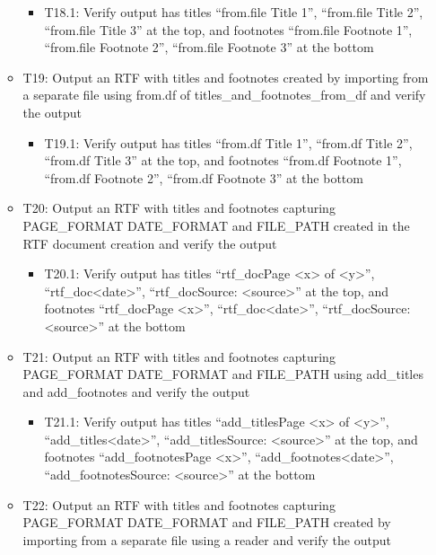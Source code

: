 \documentclass[]{article}
\providecommand{\tightlist}{%
  \setlength{\itemsep}{0pt}\setlength{\parskip}{0pt}}
\begin{document}
\begin{itemize}
\begin{itemize}
    \begin{itemize}
    \tightlist
    \item
      T18.1: Verify output has titles ``from.file Title 1'', ``from.file
      Title 2'', ``from.file Title 3'' at the top, and footnotes
      ``from.file Footnote 1'', ``from.file Footnote 2'', ``from.file
      Footnote 3'' at the bottom
    \end{itemize}
  \item
    T19: Output an RTF with titles and footnotes created by importing
    from a separate file using from.df of
    titles\_and\_footnotes\_from\_df and verify the output

    \begin{itemize}
    \tightlist
    \item
      T19.1: Verify output has titles ``from.df Title 1'', ``from.df
      Title 2'', ``from.df Title 3'' at the top, and footnotes ``from.df
      Footnote 1'', ``from.df Footnote 2'', ``from.df Footnote 3'' at
      the bottom
    \end{itemize}
  \item
    T20: Output an RTF with titles and footnotes capturing PAGE\_FORMAT
    DATE\_FORMAT and FILE\_PATH created in the RTF document creation and
    verify the output

    \begin{itemize}
    \tightlist
    \item
      T20.1: Verify output has titles ``rtf\_docPage
      \textless{}x\textgreater{} of \textless{}y\textgreater{}'',
      ``rtf\_doc\textless{}date\textgreater{}'', ``rtf\_docSource:
      \textless{}source\textgreater{}'' at the top, and footnotes
      ``rtf\_docPage \textless{}x\textgreater{}'',
      ``rtf\_doc\textless{}date\textgreater{}'', ``rtf\_docSource:
      \textless{}source\textgreater{}'' at the bottom
    \end{itemize}
  \item
    T21: Output an RTF with titles and footnotes capturing PAGE\_FORMAT
    DATE\_FORMAT and FILE\_PATH using add\_titles and add\_footnotes and
    verify the output

    \begin{itemize}
    \tightlist
    \item
      T21.1: Verify output has titles ``add\_titlesPage
      \textless{}x\textgreater{} of \textless{}y\textgreater{}'',
      ``add\_titles\textless{}date\textgreater{}'', ``add\_titlesSource:
      \textless{}source\textgreater{}'' at the top, and footnotes
      ``add\_footnotesPage \textless{}x\textgreater{}'',
      ``add\_footnotes\textless{}date\textgreater{}'',
      ``add\_footnotesSource: \textless{}source\textgreater{}'' at the
      bottom
    \end{itemize}
  \item
    T22: Output an RTF with titles and footnotes capturing PAGE\_FORMAT
    DATE\_FORMAT and FILE\_PATH created by importing from a separate
    file using a reader and verify the output


\end{itemize}
\end{itemize}
\end{document}

